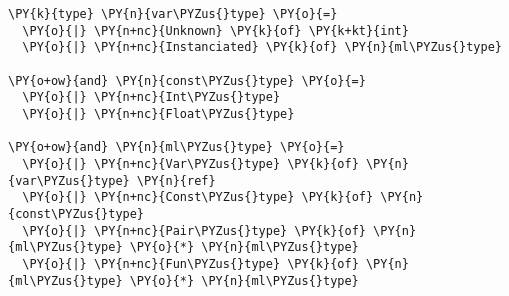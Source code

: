 \begin{Verbatim}[commandchars=\\\{\}]
\PY{k}{type} \PY{n}{var\PYZus{}type} \PY{o}{=}
  \PY{o}{|} \PY{n+nc}{Unknown} \PY{k}{of} \PY{k+kt}{int}
  \PY{o}{|} \PY{n+nc}{Instanciated} \PY{k}{of} \PY{n}{ml\PYZus{}type}

\PY{o+ow}{and} \PY{n}{const\PYZus{}type} \PY{o}{=}
  \PY{o}{|} \PY{n+nc}{Int\PYZus{}type}
  \PY{o}{|} \PY{n+nc}{Float\PYZus{}type}

\PY{o+ow}{and} \PY{n}{ml\PYZus{}type} \PY{o}{=}
  \PY{o}{|} \PY{n+nc}{Var\PYZus{}type} \PY{k}{of} \PY{n}{var\PYZus{}type} \PY{n}{ref}
  \PY{o}{|} \PY{n+nc}{Const\PYZus{}type} \PY{k}{of} \PY{n}{const\PYZus{}type}
  \PY{o}{|} \PY{n+nc}{Pair\PYZus{}type} \PY{k}{of} \PY{n}{ml\PYZus{}type} \PY{o}{*} \PY{n}{ml\PYZus{}type}
  \PY{o}{|} \PY{n+nc}{Fun\PYZus{}type} \PY{k}{of} \PY{n}{ml\PYZus{}type} \PY{o}{*} \PY{n}{ml\PYZus{}type}
\end{Verbatim}

